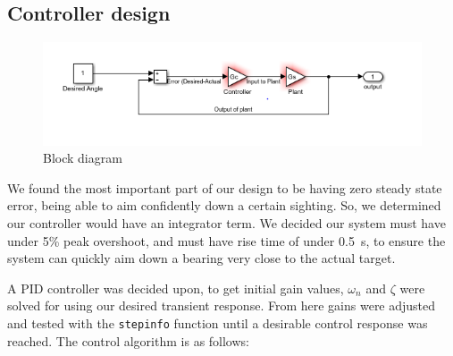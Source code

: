 ﻿\subsection{Controller design}

\begin{figure}
    \begin{center}  
    \includegraphics[width=\columnwidth]{block-diagram.png}    
    \end{center}
    \caption{Block diagram}
    \label{fig:controller1}
\end{figure}

We found the most important part of our design to be having zero steady state error, being able to aim confidently down a certain sighting. So, we determined our controller would have an integrator term. We decided our system must have under 5\% peak overshoot, and must have rise time of under \SI{0.5}{\second}, to ensure the system can quickly aim down a bearing very close to the actual target.

A PID controller was decided upon, to get initial gain values, $\omega_n$ and $\zeta$ were solved for using our desired transient response. From here gains were adjusted and tested with the \lstinline{stepinfo} function until a desirable control response was reached. The control algorithm is as follows:
